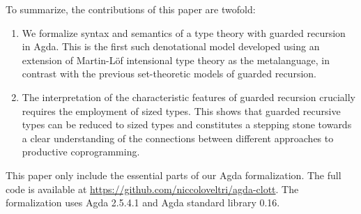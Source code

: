 
To summarize, the contributions of this paper are twofold:
\begin{enumerate}
  \item We formalize syntax and semantics of a type theory with
    guarded recursion in Agda. This is the first such denotational model developed using an extension of Martin-L\"of intensional
    type theory as the metalanguage, in contrast with the previous
    set-theoretic models of guarded recursion.
\item The interpretation of the characteristic features of guarded
  recursion crucially requires the employment of sized types. This shows that
  guarded recursive types can be reduced to sized types and
  constitutes a stepping stone towards a clear understanding of  the connections
  between different approaches to productive coprogramming.
\end{enumerate}

This paper only include the essential parts of our Agda
formalization. The full code is available at
\url{https://github.com/niccoloveltri/agda-clott}. The formalization
uses Agda 2.5.4.1 and Agda standard library 0.16.





